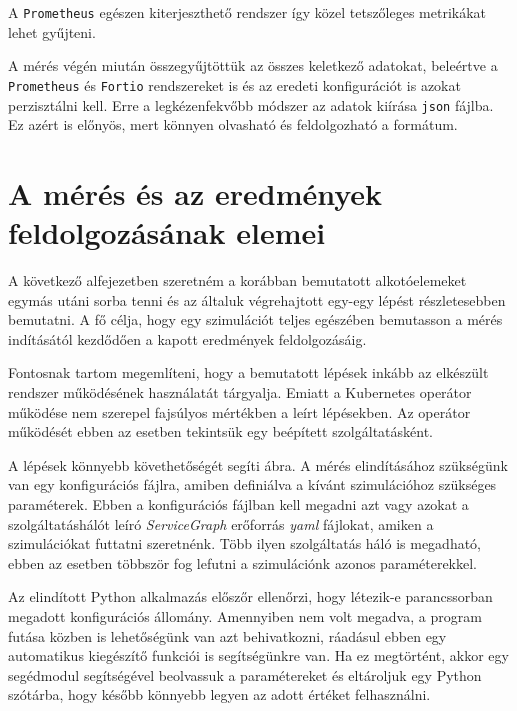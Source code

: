 A \verb+Prometheus+ egészen kiterjeszthető rendszer így közel tetszőleges metrikákat lehet gyűjteni. 


A mérés végén miután összegyűjtöttük az összes keletkező adatokat, beleértve a \verb+Prometheus+ és \verb+Fortio+ rendszereket is és az eredeti konfigurációt is azokat perzisztálni kell. Erre a legkézenfekvőbb módszer az adatok kiírása \verb+json+ fájlba. Ez azért is előnyös, mert könnyen olvasható és feldolgozható a formátum. 

\section{A mérés és az eredmények feldolgozásának elemei}
\label{sec:measure_steps}

A következő alfejezetben szeretném a korábban bemutatott alkotóelemeket egymás utáni sorba tenni és az általuk végrehajtott egy-egy lépést részletesebben bemutatni.
A fő célja, hogy egy szimulációt teljes egészében bemutasson a mérés indításától kezdődően a kapott eredmények feldolgozásáig.

Fontosnak tartom megemlíteni, hogy a bemutatott lépések inkább az elkészült rendszer működésének használatát tárgyalja.
Emiatt a Kubernetes operátor működése nem szerepel fajsúlyos mértékben a leírt lépésekben.
Az operátor működését ebben az esetben tekintsük egy beépített szolgáltatásként.

A lépések könnyebb követhetőségét segíti  ábra.
A mérés elindításához szükségünk van egy konfigurációs fájlra, amiben definiálva a kívánt szimulációhoz szükséges paraméterek.
Ebben a konfigurációs fájlban kell megadni azt vagy azokat a szolgáltatáshálót leíró \textit{ServiceGraph} erőforrás \textit{yaml} fájlokat, amiken a szimulációkat futtatni szeretnénk.
Több ilyen szolgáltatás háló is megadható, ebben az esetben többször fog lefutni a szimulációnk azonos paraméterekkel.

Az elindított Python alkalmazás előszőr ellenőrzi, hogy létezik-e parancssorban megadott konfigurációs állomány.
Amennyiben nem volt megadva, a program futása közben is lehetőségünk van azt behivatkozni, ráadásul ebben egy automatikus kiegészítő funkciói is segítségünkre van.
Ha ez megtörtént, akkor egy segédmodul segítségével beolvassuk a paramétereket és eltároljuk egy Python szótárba, hogy később könnyebb legyen az adott értéket felhasználni.

